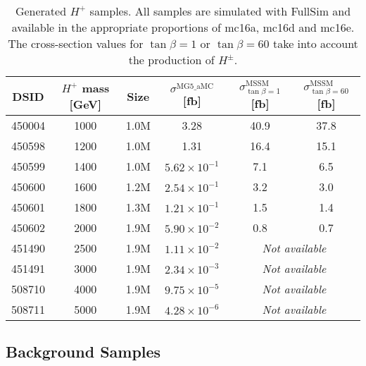 \begin{table}[H]
  \centering
  \begin{tabular*}{170mm}{@{\extracolsep{\fill}}cccccc}
    \hline\hline
    DSID   & $H^{+}$ mass [GeV] & Size & ${\sigma}^{\text{MG5\_aMC}}$ [fb] & ${\sigma}_{\tan{\beta}=1}^{\text{MSSM}}$ [fb] & ${\sigma}_{\tan{\beta}=60}^{\text{MSSM}}$ [fb]\\
    \hline
    450004 & 1000 & 1.0M & 3.28                  & 40.9 & 37.8\\
    450598 & 1200 & 1.0M & 1.31                  & 16.4 & 15.1\\
    450599 & 1400 & 1.0M & $5.62{\times}10^{-1}$ &  7.1 &  6.5\\
    450600 & 1600 & 1.2M & $2.54{\times}10^{-1}$ &  3.2 &  3.0\\
    450601 & 1800 & 1.3M & $1.21{\times}10^{-1}$ &  1.5 &  1.4\\
    450602 & 2000 & 1.9M & $5.90{\times}10^{-2}$ &  0.8 &  0.7\\
    451490 & 2500 & 1.9M & $1.11{\times}10^{-2}$ & \multicolumn{2}{c}{\textit{Not available}}\\
    451491 & 3000 & 1.9M & $2.34{\times}10^{-3}$ & \multicolumn{2}{c}{\textit{Not available}}\\     
    508710 & 4000 & 1.9M & $9.75{\times}10^{-5}$ & \multicolumn{2}{c}{\textit{Not available}}\\     
    508711 & 5000 & 1.9M & $4.28{\times}10^{-6}$ & \multicolumn{2}{c}{\textit{Not available}}\\     
    \hline\hline
  \end{tabular*}
  \caption{Generated $H^{+}$ samples. All samples are simulated with FullSim and available in the appropriate proportions of mc16a, mc16d and mc16e. The cross-section values for $\tan{\beta}=1$ or $\tan{\beta}=60$ take into account the production of $H^{\pm}$.}
  \label{tab:SignalSamples}
\end{table}

{}


\subsection{Background Samples}
\label{subsec:BkgSample}

